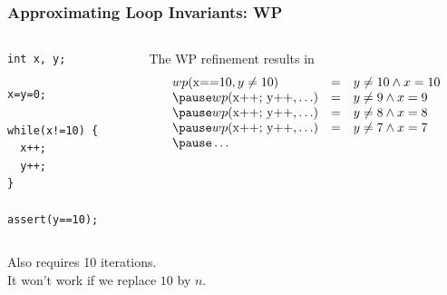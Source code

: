 \begin{frame}[fragile]
\frametitle{Approximating Loop Invariants: WP}

\begin{columns}
\begin{column}{.3\textwidth}
\begin{lstlisting}
int x, y;

x=y=0;

while(x!=10) {
  x++;
  y++;
}

assert(y==10);
\end{lstlisting}
\end{column}
\begin{column}{.6\textwidth}
The WP refinement results in
%
\[ \begin{array}{lll}
wp(\lstinline!x==10!, y\not=10) &=& y\not=10 \land x=10 \\
\pause
wp(\lstinline!x++; y++!, \ldots) &=& y\not=9 \land x=9 \\
\pause
wp(\lstinline!x++; y++!, \ldots) &=& y\not=8 \land x=8 \\
\pause
wp(\lstinline!x++; y++!, \ldots) &=& y\not=7 \land x=7 \\
\pause
\ldots
\end{array} \]
\end{column}
\end{columns}
\vfill

\myfail{} Also requires 10 iterations.\\
\myfail{} It won't work if we replace $10$ by $n$.

\end{frame}


\newlength{\uxdist}
\setlength{\uxdist}{2.3cm}

